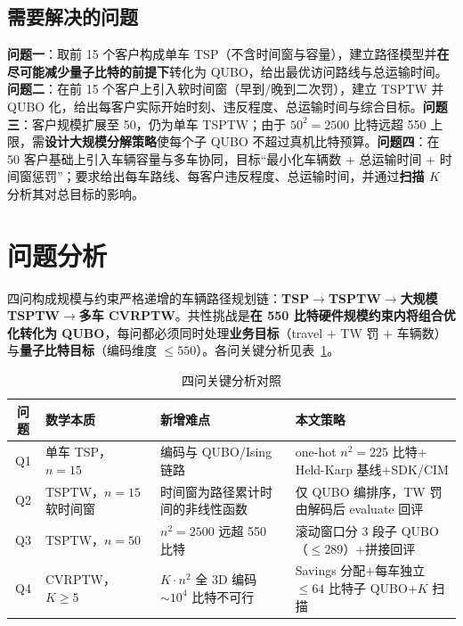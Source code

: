 \documentclass[UTF8,12pt,a4paper]{ctexart}
\begin{document}
\subsection{需要解决的问题}

\textbf{问题一}：取前 15 个客户构成单车 TSP（不含时间窗与容量），建立路径模型并\textbf{在尽可能减少量子比特的前提下}转化为 QUBO，给出最优访问路线与总运输时间。\textbf{问题二}：在前 15 个客户上引入软时间窗（早到/晚到二次罚），建立 TSPTW 并 QUBO 化，给出每客户实际开始时刻、违反程度、总运输时间与综合目标。\textbf{问题三}：客户规模扩展至 50，仍为单车 TSPTW；由于 $50^{2}=2500$ 比特远超 550 上限，需\textbf{设计大规模分解策略}使每个子 QUBO 不超过真机比特预算。\textbf{问题四}：在 50 客户基础上引入车辆容量与多车协同，目标``最小化车辆数 $+$ 总运输时间 $+$ 时间窗惩罚''；要求给出每车路线、每客户违反程度、总运输时间，并通过\textbf{扫描 $K$} 分析其对总目标的影响。

\section{问题分析}

四问构成规模与约束严格递增的车辆路径规划链：\textbf{TSP$\to$TSPTW$\to$大规模 TSPTW$\to$多车 CVRPTW}。共性挑战是\textbf{在 550 比特硬件规模约束内将组合优化转化为 QUBO}，每问都必须同时处理\textbf{业务目标}（travel $+$ TW 罚 $+$ 车辆数）与\textbf{量子比特目标}（编码维度 $\le 550$）。各问关键分析见表~\ref{tab:prob-analysis}。

\begin{table}[H]
    \centering\footnotesize
    \caption{四问关键分析对照}
    \label{tab:prob-analysis}
    \begin{tabularx}{\textwidth}{c X X X}
        \toprule
        问题 & 数学本质 & 新增难点 & 本文策略 \\
        \midrule
        Q1 & 单车 TSP，$n=15$ & 编码与 QUBO/Ising 链路 & one-hot $n^2=225$ 比特$+$Held-Karp 基线$+$SDK/CIM \\
        Q2 & TSPTW，$n=15$ 软时间窗 & 时间窗为路径累计时间的非线性函数 & 仅 QUBO 编排序，TW 罚由解码后 evaluate 回评 \\
        Q3 & TSPTW，$n=50$ & $n^2=2500$ 远超 550 比特 & 滚动窗口分 3 段子 QUBO（$\le 289$）$+$拼接回评 \\
        Q4 & CVRPTW，$K\ge 5$ & $K\!\cdot\!n^2$ 全 3D 编码$\sim 10^4$ 比特不可行 & Savings 分配$+$每车独立 $\le 64$ 比特子 QUBO$+K$ 扫描 \\
        \bottomrule
    \end{tabularx}
\end{table}
\end{document}
